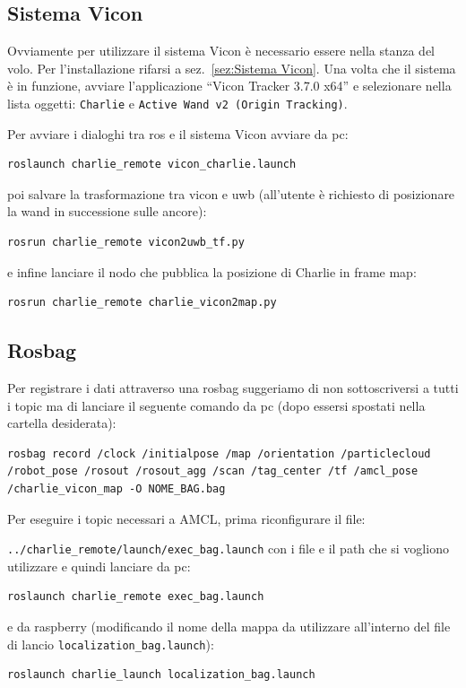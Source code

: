 \subsection*{Sistema Vicon}
Ovviamente per utilizzare il sistema Vicon \`e necessario essere nella stanza del volo. 
Per l'installazione rifarsi a sez.~\ref{sez:Sistema Vicon}. 
Una volta che il sistema \`e in funzione, avviare l'applicazione ``Vicon Tracker 3.7.0 x64'' e selezionare nella lista oggetti: \texttt{Charlie} e \texttt{Active Wand v2 (Origin Tracking)}.

Per avviare i dialoghi tra ros e il sistema Vicon avviare da pc:
\begin{lstlisting}[style=bashPC]
	roslaunch charlie_remote vicon_charlie.launch
\end{lstlisting}

poi salvare la trasformazione tra vicon e uwb (all'utente \`e richiesto di posizionare la wand in successione sulle ancore):
\begin{lstlisting}[style=bashPC]
	rosrun charlie_remote vicon2uwb_tf.py
\end{lstlisting}

e infine lanciare il nodo che pubblica la posizione di Charlie in frame map:
\begin{lstlisting}[style=bashPC]
	rosrun charlie_remote charlie_vicon2map.py
\end{lstlisting}


\subsection*{Rosbag}
Per registrare i dati attraverso una rosbag suggeriamo di non sottoscriversi a tutti i topic ma di lanciare il seguente comando da pc (dopo essersi spostati nella cartella desiderata):
\begin{lstlisting}[style=bashPC]
	rosbag record /clock /initialpose /map /orientation /particlecloud /robot_pose /rosout /rosout_agg /scan /tag_center /tf /amcl_pose /charlie_vicon_map -O NOME_BAG.bag
\end{lstlisting}

Per eseguire i topic necessari a AMCL, prima riconfigurare il file:

\verb|../charlie_remote/launch/exec_bag.launch| con i file e il path che si vogliono utilizzare e quindi lanciare da pc:
\begin{lstlisting}[style=bashPC]
	roslaunch charlie_remote exec_bag.launch
\end{lstlisting}
e da raspberry (modificando il nome della mappa da utilizzare all'interno del file di lancio \verb|localization_bag.launch|):
\begin{lstlisting}[style=bash]
	roslaunch charlie_launch localization_bag.launch
\end{lstlisting}

